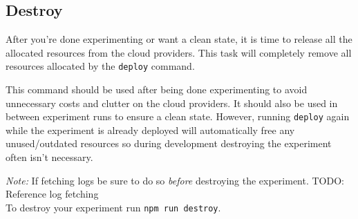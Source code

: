\documentclass[../main.tex]{subfiles}
\begin{document}
\subsection{Destroy}\label{sec:destroy}
After you're done experimenting or want a clean state, it is time to release all the allocated resources from the cloud providers.
This task will completely remove all resources allocated by the \texttt{deploy} command. 

This command should be used after being done experimenting to avoid unnecessary costs and clutter on the cloud providers.
It should also be used in between experiment runs to ensure a clean state.
However, running \texttt{deploy} again while the experiment is already deployed will automatically free any unused/outdated resources so during development destroying the experiment often isn't necessary.

\textit{Note:} If fetching logs be sure to do so \textit{before} destroying the experiment. TODO: Reference log fetching\\
To destroy your experiment run \texttt{npm run destroy}.\\
\end{document}
